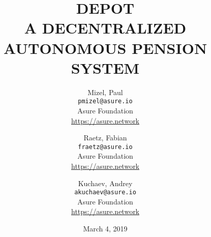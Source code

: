 
\title{\textbf{DEPOT}\\A DECENTRALIZED AUTONOMOUS PENSION SYSTEM}
\author{
  Mizel, Paul\\
  \texttt{pmizel@asure.io}\\
  Asure Foundation \\ 
  {\url{https://asure.network}}\\
  \and
  Raetz, Fabian\\
  \texttt{fraetz@asure.io}\\
  Asure Foundation \\ 
  {\url{https://asure.network}}\\
  \and
  Kuchaev, Andrey\\
  \texttt{akuchaev@asure.io}\\
  Asure Foundation \\ 
  {\url{https://asure.network}}\\
}

\date{March 4, 2019}
\maketitle

